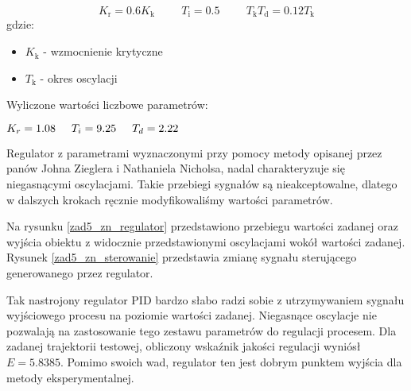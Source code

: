 \begin{equation}
\label{zad5_zn_wzory}
K_{\mathrm{r}}=\num{0,6}K_{\mathrm{k}} \hspace{1cm} T_{\mathrm{i}}=\num{0,5} \hspace{1cm} T_{\mathrm{k}} T_{\mathrm{d}}=\num{0,12} T_{\mathrm{k}}
\end{equation}
gdzie:
\begin{center}
\begin{itemize}
    \item $K_{\mathrm{k}}$ - wzmocnienie krytyczne
    \item $T_{\mathrm{k}}$ - okres oscylacji
\end{itemize}
\end{center}

Wyliczone wartości liczbowe parametrów:
\begin{center}
$K_{r}=\num{1,08} \hspace{0.5 cm}
T_{i}=\num{9,25}   \hspace{0.5 cm}
T_{d}=\num{2,22}$
\end{center}

Regulator z parametrami wyznaczonymi przy pomocy metody opisanej przez panów Johna Zieglera
i Nathaniela Nicholsa, nadal charakteryzuje się niegasnącymi oscylacjami. Takie 
przebiegi sygnałów są nieakceptowalne, dlatego w dalszych krokach ręcznie modyfikowaliśmy 
wartości parametrów. 

Na rysunku \ref{zad5_zn_regulator} przedstawiono przebiegu wartości zadanej oraz
wyjścia obiektu z widocznie przedstawionymi oscylacjami wokół wartości zadanej.
Rysunek \ref{zad5_zn_sterowanie} przedstawia zmianę sygnału sterującego
generowanego przez regulator.

Tak nastrojony regulator PID bardzo słabo radzi sobie z utrzymywaniem sygnału wyjściowego
procesu na poziomie wartości zadanej. Niegasnące oscylacje nie pozwalają na zastosowanie
tego zestawu parametrów do regulacji procesem. Dla zadanej trajektorii testowej, obliczony 
wskaźnik jakości regulacji wyniósł $E = \num{5,8385}$. Pomimo swoich wad, regulator ten jest 
dobrym punktem wyjścia dla metody eksperymentalnej.

